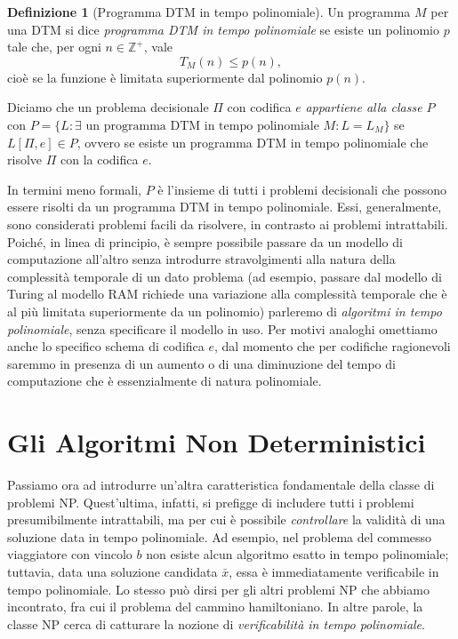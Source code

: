 \documentclass[10pt]{\classname}
\theoremstyle{newlinethm}
\theoremstyle{theorem}
\theoremstyle{definition}
\newtheorem{definizione}{Definizione}[section]
\theoremstyle{definition}
\theoremstyle{definition}
\theoremstyle{definition}
\begin{document}
\begin{definizione}[Programma DTM in tempo polinomiale]
    Un programma $M$ per una DTM si dice \emph{programma DTM in tempo polinomiale} se esiste un polinomio $p$ tale che, per ogni $n \in \mathbb Z^+$, vale \[T_M(n) \leq p(n),\] cioè se la funzione è limitata superiormente dal polinomio $p(n)$.

    Diciamo che un problema decisionale $\Pi$ con codifica $e$ \emph{appartiene alla classe $P$} con $P = \{L : \exists \mbox{ un programma DTM in tempo polinomiale } M : L=L_M\}$ se $L[\Pi, e] \in P$, ovvero se esiste un programma DTM in tempo polinomiale che risolve $\Pi$ con la codifica $e$.
\end{definizione}

In termini meno formali, $P$ è l'insieme di tutti i problemi decisionali che possono essere risolti da un programma DTM in tempo polinomiale. Essi, generalmente, sono considerati problemi facili da risolvere, in contrasto ai problemi intrattabili. Poiché, in linea di principio, è sempre possibile passare da un modello di computazione all'altro senza introdurre stravolgimenti alla natura della complessità temporale di un dato problema (ad esempio, passare dal modello di Turing al modello RAM richiede una variazione alla complessità temporale che è al più limitata superiormente da un polinomio) parleremo di \emph{algoritmi in tempo polinomiale}, senza specificare il modello in uso. Per motivi analoghi omettiamo anche lo specifico schema di codifica $e$, dal momento che per codifiche ragionevoli saremmo in presenza di un aumento o di una diminuzione del tempo di computazione che è essenzialmente di natura polinomiale.

\section{Gli Algoritmi Non Deterministici}

Passiamo ora ad introdurre un'altra caratteristica fondamentale della classe di problemi NP. Quest'ultima, infatti, si prefigge di includere tutti i problemi presumibilmente intrattabili, ma per cui è possibile \emph{controllare} la validità di una soluzione data in tempo polinomiale. Ad esempio, nel problema del commesso viaggiatore con vincolo $b$ non esiste alcun algoritmo esatto in tempo polinomiale; tuttavia, data una soluzione candidata $\bar x$, essa è immediatamente verificabile in tempo polinomiale. Lo stesso può dirsi per gli altri problemi NP che abbiamo incontrato, fra cui il problema del cammino hamiltoniano. In altre parole, la classe NP cerca di catturare la nozione di \emph{verificabilità in tempo polinomiale}.
\end{document}
